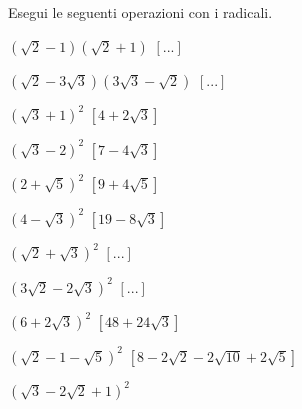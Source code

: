 \begin{esercizio}[\Ast]
 \label{ese:2.55}
Esegui le seguenti operazioni con i radicali.
 \begin{multicols}{2}
 \begin{enumeratea}
 \item \((\sqrt 2-1)(\sqrt 2+1)\)
  \hfill \(\left[...\right]\)
 \item \((\sqrt 2-3\sqrt 3)(3\sqrt 3-\sqrt 2)\)
  \hfill \(\left[...\right]\)
 \item \((\sqrt 3+1)^2\)
  \hfill \(\left[4+2\sqrt 3\right]\)
 \item \((\sqrt 3-2)^2\)
  \hfill \(\left[7-4\sqrt 3\right]\)
 \item \((2+\sqrt 5)^2\)
  \hfill \(\left[9+4\sqrt 5\right]\)
 \item \((4-\sqrt 3)^2\)
  \hfill \(\left[19-8\sqrt 3\right]\)
 \item \((\sqrt 2+\sqrt 3)^2\)
  \hfill \(\left[...\right]\)
 \item \((3\sqrt 2-2\sqrt 3)^2\)
  \hfill \(\left[...\right]\)
 \item \((6+2\sqrt 3)^2\)
  \hfill \(\left[48+24\sqrt 3\right]\)
 \item \((\sqrt 2-1-\sqrt 5)^2\)
  \hfill \(\left[8-2\sqrt 2-2\sqrt{10}+2\sqrt 5\right]\)
 \item \((\sqrt 3-2\sqrt 2+1)^2\)

\end{enumeratea}
\end{multicols}
\end{esercizio}
